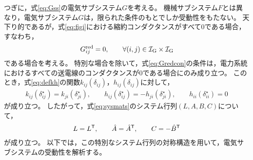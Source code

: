 \documentclass[tombow,dvipdfmx]{corona-a5-1.1}
\begin{document}
つぎに，式\ref{eq:Gss}の電気サブシステム$G$を考える。
機械サブシステム$F$とは異なり，電気サブシステム$G$は，限られた条件のもとでしか受動性をもたない。
天下り的であるが，式\ref{eq:figi}における縮約コンダクタンスがすべて0である場合，すなわち，
\begin{align}\label{eq:Gredcon}
G^{\rm red}_{ij}=0,\qquad 
\forall (i, j) \in \mathcal{I}_{\rm G} \times \mathcal{I}_{\rm G}
\end{align}
である場合を考える。
特別な場合を除いて，式\ref{eq:Gredcon}の条件は，電力系統におけるすべての送電線のコンダクタンスが0である場合にのみ成り立つ。
このとき，式\ref{eq:defkh}の関数$k_{ij}(\delta_{ij})$，$h_{ij}(\delta_{ij})$に対して，
\begin{align*}
k_{ij}(\delta_{ij}^{\star}) =
k_{ji}(\delta_{ji}^{\star})
,\qquad
h_{ij}(\delta_{ij}^{\star}) = 
- h_{ji}(\delta_{ji}^{\star}),\qquad
h_{ii}(\delta_{ii}^{\star}) = 0
\end{align*}
が成り立つ。
したがって，式\ref{eq:sysmats}のシステム行列$(L,A,B,C)$について，
\begin{align}\label{eq:sysmatst}
L=L^{\sf T} ,\qquad
\hat{A} = \hat{A}^{\sf T},\qquad
C= -\hat{B}^{\sf T}
\end{align}
が成り立つ。
以下では，この特別なシステム行列の対称構造を用いて，電気サブシステムの受動性を解析する。
\end{document}
